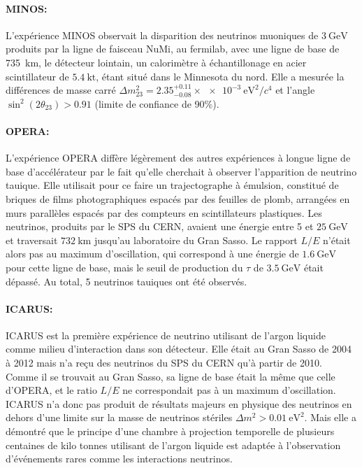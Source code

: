             \paragraph{MINOS\cite{minos}:} L'expérience MINOS observait la disparition des neutrinos muoniques de $\SI{3}{\giga\electronvolt}$ produits par la ligne de faisceau NuMi, au fermilab, avec une ligne de base de \SI{735}{\kilo\meter}, le détecteur lointain, un calorimètre à échantillonage en acier scintillateur de $\SI{5.4}{\kilo\tonne}$, étant situé dans le Minnesota du nord. Elle a mesurée la différences de masse carré $\Delta m_{23}^2 = 2.35^{+0.11}_{-0.08}\times\SI{e-3}{\electronvolt\squared\per c^4}$ et l'angle $\sin^2(2\theta_{23}) > 0.91$ (limite de confiance de 90\%). 
            
            \paragraph{OPERA\cite{opera}:} L'expérience OPERA diffère légèrement des autres expériences à longue ligne de base d'accélérateur par le fait qu'elle cherchait à observer l'apparition de neutrino tauique. Elle utilisait pour ce faire un trajectographe à émulsion, constitué de  briques de films photographiques espacés par des feuilles de plomb, arrangées en murs parallèles espacés par des compteurs en scintillateurs plastiques. Les neutrinos, produits par le SPS du CERN, avaient une énergie entre 5 et $\SI{25}{\giga\electronvolt}$ et traversait $\SI{732}{\kilo\meter}$ jusqu'au laboratoire du Gran Sasso. Le rapport $L/E$ n'était alors pas au maximum d'oscillation, qui correspond à une énergie de $\SI{1.6}{\giga\electronvolt}$ pour cette ligne de base, mais le seuil de production du $\tau$ de $\SI{3.5}{\giga\electronvolt}$ était dépassé. Au total, 5 neutrinos tauiques ont été observés.
            
            \paragraph{ICARUS\cite{icarus}:} ICARUS est la première expérience de neutrino utilisant de l'argon liquide comme milieu d'interaction dans son détecteur. Elle était au Gran Sasso de 2004 à 2012 mais n'a reçu des neutrinos du SPS du CERN qu'à partir de 2010. Comme il se trouvait au Gran Sasso, sa ligne de base était la même que celle d'OPERA, et le ratio $L/E$ ne correspondait pas à un maximum d'oscillation. ICARUS n'a donc pas produit de résultats majeurs en physique des neutrinos en dehors d'une limite sur la masse de neutrinos stériles $\Delta m^2 > \SI{0.01}{\electronvolt\squared}$. Mais elle a démontré que le principe d'une chambre à projection temporelle de plusieurs centaines de kilo tonnes utilisant de l'argon liquide est adaptée à l'observation d'événements rares comme les interactions neutrinos. 
            
